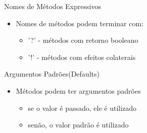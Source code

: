 \begin{frame}[fragile,t]{Nomes de Métodos Expressivos}
  \begin{itemize}
    \item Nomes de métodos podem terminar com:
    \begin{itemize}
    	\item \alert{'?'} - métodos com retorno booleano
    	\item \alert{'!'} - métodos com efeitos colaterais
    \end{itemize}
    
	
  \end{itemize}   
\end{frame}

\begin{frame}[fragile,t]{Argumentos Padrões(Defaults)}
  \begin{itemize}
    \item Métodos podem ter argumentos padrões
    \begin{itemize}
    	\item se o valor é passado, ele é utilizado
    	\item senão, o valor padrão é utilizado
    \end{itemize}
  \end{itemize}  
  
\end{frame}

